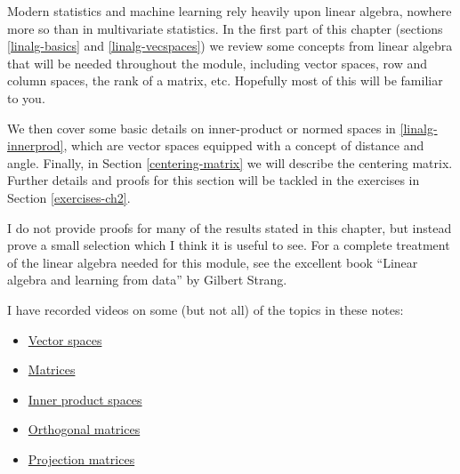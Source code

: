 \documentclass[]{book}
\providecommand{\tightlist}{%
  \setlength{\itemsep}{0pt}\setlength{\parskip}{0pt}}
\theoremstyle{definition}
\theoremstyle{definition}
\theoremstyle{definition}
\theoremstyle{remark}
\begin{document}
Modern statistics and machine learning rely heavily upon linear algebra, nowhere more so than in multivariate statistics. In the first part of this chapter (sections \ref{linalg-basics} and \ref{linalg-vecspaces}) we review some concepts from linear algebra that will be needed throughout the module, including vector spaces, row and column spaces, the rank of a matrix, etc. Hopefully most of this will be familiar to you.

We then cover some basic details on inner-product or normed spaces in \ref{linalg-innerprod}, which are vector spaces equipped with a concept of distance and angle.
Finally, in Section \ref{centering-matrix} we will describe the centering matrix. Further details and proofs for this section will be tackled in the exercises in Section \ref{exercises-ch2}.

I do not provide proofs for many of the results stated in this chapter, but instead prove a small selection which I think it is useful to see. For a complete treatment of the linear algebra needed for this module, see the excellent book ``Linear algebra and learning from data'' by Gilbert Strang.

I have recorded videos on some (but not all) of the topics in these notes:

\begin{itemize}
\tightlist
\item
  \href{https://mediaspace.nottingham.ac.uk/media/Vector+Spaces/1_48xqrp04}{Vector spaces}
\item
  \href{https://mediaspace.nottingham.ac.uk/media/Matrices/1_nqo2u7zs}{Matrices}
\item
  \href{https://mediaspace.nottingham.ac.uk/media/Inner+Product+Spaces/1_nhcbybg3}{Inner product spaces}
\item
  \href{https://mediaspace.nottingham.ac.uk/media/Orthogonal+Matrices/1_rr2ervcs}{Orthogonal matrices}
\item
  \href{https://mediaspace.nottingham.ac.uk/media/Projection/1_soh726fg}{Projection matrices}
\end{itemize}
\end{document}
